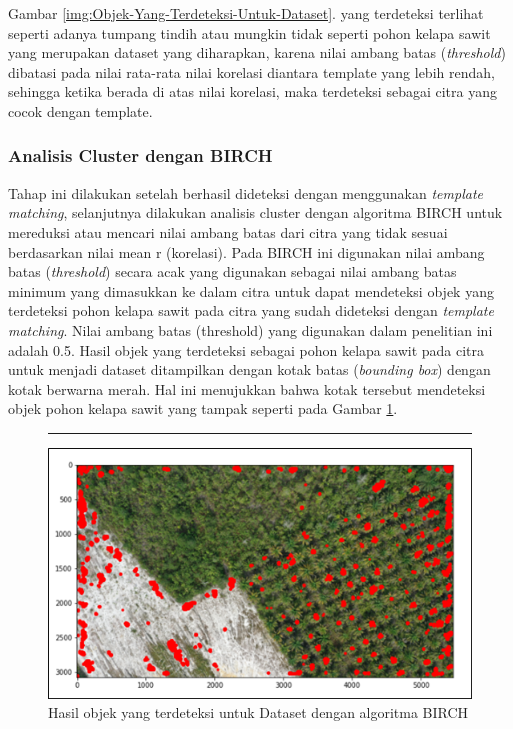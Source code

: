Gambar \ref{img:Objek-Yang-Terdeteksi-Untuk-Dataset}. yang terdeteksi terlihat seperti adanya tumpang tindih atau mungkin tidak seperti pohon kelapa sawit yang merupakan dataset yang diharapkan, karena nilai ambang batas (\textit{threshold}) dibatasi pada nilai rata-rata nilai korelasi diantara template yang lebih rendah, sehingga ketika berada di atas nilai korelasi, maka terdeteksi sebagai citra yang cocok dengan template.

\subsubsection{Analisis Cluster dengan BIRCH}
\hspace{1,2cm}
Tahap ini dilakukan setelah berhasil dideteksi dengan menggunakan \textit{template matching}, selanjutnya dilakukan analisis cluster dengan algoritma BIRCH untuk mereduksi atau mencari nilai ambang batas dari citra yang tidak sesuai berdasarkan nilai mean r (korelasi). Pada BIRCH ini digunakan nilai ambang batas (\textit{threshold}) secara acak yang digunakan sebagai nilai ambang batas minimum yang dimasukkan ke dalam citra untuk dapat mendeteksi objek yang terdeteksi pohon kelapa sawit pada citra yang sudah dideteksi dengan \textit{template matching}. Nilai ambang batas (threshold) yang digunakan dalam penelitian ini adalah 0.5. Hasil objek yang terdeteksi sebagai pohon kelapa sawit pada citra untuk menjadi dataset ditampilkan dengan kotak batas (\textit{bounding box}) dengan kotak berwarna merah. Hal ini menujukkan bahwa kotak tersebut mendeteksi objek pohon kelapa sawit yang tampak seperti pada Gambar \ref{img:Hasil-Objek-Yang-Terdeteksi}.

\begin{figure}[H]
	\vspace{-0.1cm}
	\rule{\columnwidth}{0.1pt}
	\begin{center}
		\includegraphics[width=1\columnwidth]{bab4/Gambar/Picture16.png}
	\end{center}
	\vspace{-0.2cm}
	\captionsetup{justification=centering}
	\caption{Hasil objek yang terdeteksi untuk Dataset dengan algoritma BIRCH}\label{img:Hasil-Objek-Yang-Terdeteksi}
\end{figure}


